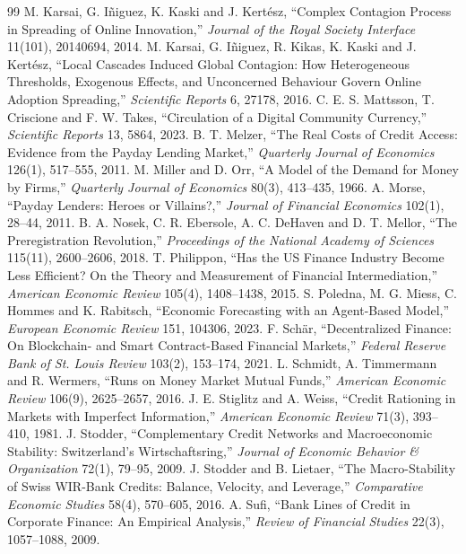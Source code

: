 \documentclass[10pt,a4paper]{article}
\theoremstyle{remark}
\begin{document}
\begin{thebibliography}{99}
 M. Karsai, G. I\~niguez, K. Kaski and J. Kert\'esz, ``Complex Contagion Process in Spreading of Online Innovation,'' \emph{Journal of the Royal Society Interface} 11(101), 20140694, 2014.
 M. Karsai, G. I\~niguez, R. Kikas, K. Kaski and J. Kert\'esz, ``Local Cascades Induced Global Contagion: How Heterogeneous Thresholds, Exogenous Effects, and Unconcerned Behaviour Govern Online Adoption Spreading,'' \emph{Scientific Reports} 6, 27178, 2016.
 C. E. S. Mattsson, T. Criscione and F. W. Takes, ``Circulation of a Digital Community Currency,'' \emph{Scientific Reports} 13, 5864, 2023.
 B. T. Melzer, ``The Real Costs of Credit Access: Evidence from the Payday Lending Market,'' \emph{Quarterly Journal of Economics} 126(1), 517--555, 2011.
 M. Miller and D. Orr, ``A Model of the Demand for Money by Firms,'' \emph{Quarterly Journal of Economics} 80(3), 413--435, 1966.
 A. Morse, ``Payday Lenders: Heroes or Villains?,'' \emph{Journal of Financial Economics} 102(1), 28--44, 2011.
 B. A. Nosek, C. R. Ebersole, A. C. DeHaven and D. T. Mellor, ``The Preregistration Revolution,'' \emph{Proceedings of the National Academy of Sciences} 115(11), 2600--2606, 2018.
 T. Philippon, ``Has the US Finance Industry Become Less Efficient? On the Theory and Measurement of Financial Intermediation,'' \emph{American Economic Review} 105(4), 1408--1438, 2015.
 S. Poledna, M. G. Miess, C. Hommes and K. Rabitsch, ``Economic Forecasting with an Agent-Based Model,'' \emph{European Economic Review} 151, 104306, 2023.
 F. Sch\"ar, ``Decentralized Finance: On Blockchain- and Smart Contract-Based Financial Markets,'' \emph{Federal Reserve Bank of St. Louis Review} 103(2), 153--174, 2021.
 L. Schmidt, A. Timmermann and R. Wermers, ``Runs on Money Market Mutual Funds,'' \emph{American Economic Review} 106(9), 2625--2657, 2016.
 J. E. Stiglitz and A. Weiss, ``Credit Rationing in Markets with Imperfect Information,'' \emph{American Economic Review} 71(3), 393--410, 1981.
 J. Stodder, ``Complementary Credit Networks and Macroeconomic Stability: Switzerland's Wirtschaftsring,'' \emph{Journal of Economic Behavior \& Organization} 72(1), 79--95, 2009.
 J. Stodder and B. Lietaer, ``The Macro-Stability of Swiss WIR-Bank Credits: Balance, Velocity, and Leverage,'' \emph{Comparative Economic Studies} 58(4), 570--605, 2016.
 A. Sufi, ``Bank Lines of Credit in Corporate Finance: An Empirical Analysis,'' \emph{Review of Financial Studies} 22(3), 1057--1088, 2009.

\end{thebibliography}
\end{document}
